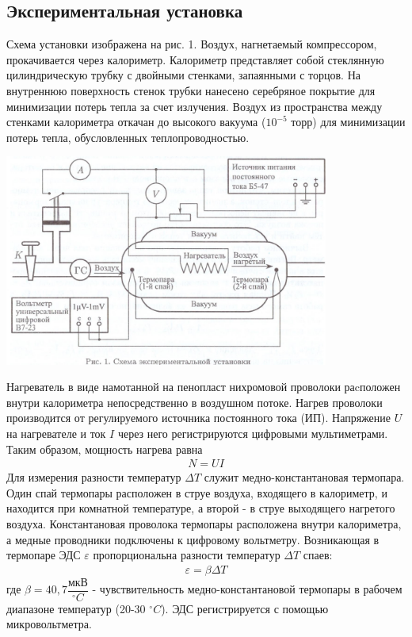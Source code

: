 \documentclass[a4paper, 12pt]{article}%
\begin{document}
\subsection*{Экспериментальная установка}
Схема установки изображена на рис. 1. Воздух, нагнетаемый компрессором, прокачивается через калориметр. Калориметр представляет собой стеклянную цилиндрическую трубку с двойными стенками, запаянными с торцов. На внутреннюю поверхность стенок трубки нанесено серебряное покрытие для минимизации потерь тепла за счет излучения. Воздух из пространства между стенками калориметра откачан до высокого вакуума ($10^{-5}$ торр) для минимизации потерь тепла, обусловленных теплопроводностью.
\begin{center}
\includegraphics[width = 0.8\textwidth]{211_1.jpg}
\end{center}
Нагреватель в виде намотанной на пенопласт нихромовой проволоки раcположен внутри калориметра непосредственно в воздушном потоке. Нагрев проволоки производится от регулируемого источника постоянного тока (ИП). Напряжение $U$ на нагревателе и ток $I$ через него регистрируются цифровыми мультиметрами. Таким образом, мощность нагрева равна
\begin{equation}
\begin{aligned}
N = UI 
\end{aligned}
\end{equation}
Для измерения разности температур $\Delta T$ служит медно-константановая термопара. Один спай термопары расположен в струе воздуха, входящего в калориметр, и находится при комнатной температуре, а второй - в струе выходящего нагретого воздуха. Константановая проволока термопары расположена внутри калориметра, а медные проводники подключены к цифровому вольтметру. Возникающая в термопаре ЭДС $\varepsilon$ пропорциональна разности температур $\Delta T$ спаев:
\begin{equation}
\begin{aligned}
\varepsilon = \beta \Delta T
\end{aligned}
\end{equation}
где $\beta = 40,7 \dfrac{\text{мкВ}}{ ^{\circ} C}$ - чувствительность медно-константановой термопары в рабочем диапазоне температур (20-30 $ ^{\circ} C$). ЭДС регистрируется с помощью микровольтметра.
\end{document}
